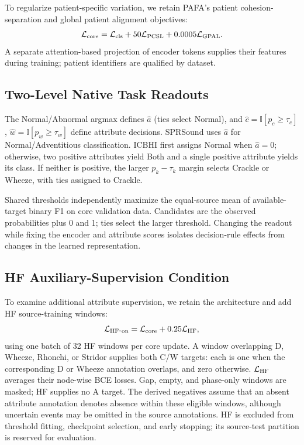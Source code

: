 To regularize patient-specific variation, we retain PAFA's patient
cohesion-separation and global patient alignment objectives\cite{jeong2025pafa}:
\begin{equation}
\mathcal L_{\rm core}=\mathcal L_{\rm cls}+50\mathcal L_{\rm PCSL}
                                  +0.0005\mathcal L_{\rm GPAL}.
\end{equation}
A separate attention-based projection of encoder tokens supplies their
features during training; patient identifiers are qualified by dataset.

\subsection{Two-Level Native Task Readouts}
The Normal/Abnormal argmax defines $\hat a$ (ties select Normal), and
$\hat c=\mathbb{I}[p_c\geq\tau_c]$,
$\hat w=\mathbb{I}[p_w\geq\tau_w]$ define attribute decisions.
SPRSound uses $\hat a$ for Normal/Adventitious classification.
ICBHI first assigns Normal when $\hat a=0$; otherwise, two positive
attributes yield Both and a single positive attribute yields its class.
If neither is positive, the larger $p_k-\tau_k$ margin selects Crackle
or Wheeze, with ties assigned to Crackle.

Shared thresholds independently maximize the equal-source mean of
available-target binary F1 on core validation data. Candidates are the
observed probabilities plus 0 and 1; ties select the larger threshold.
Changing the readout while fixing the encoder and attribute scores isolates
decision-rule effects from changes in the learned representation.

\subsection{HF Auxiliary-Supervision Condition}
\label{sec:hf_method}
To examine additional attribute supervision, we retain the architecture
and add HF source-training windows:
\begin{equation}
\mathcal L_{\rm HF\mbox{-}on}=\mathcal L_{\rm core}+0.25\mathcal L_{\rm HF},
\end{equation}
using one batch of 32 HF windows per core update. A window overlapping
D, Wheeze, Rhonchi, or Stridor supplies both C/W targets: each is one
when the corresponding D or Wheeze annotation overlaps, and zero otherwise.
$\mathcal L_{\rm HF}$ averages their node-wise BCE losses.
Gap, empty, and phase-only windows are masked; HF supplies no A target.
The derived negatives assume that an absent attribute annotation denotes
absence within these eligible windows, although uncertain events may be
omitted in the source annotations\cite{hsu2021hflung}.
HF is excluded from threshold fitting, checkpoint selection, and early
stopping; its source-test partition is reserved for evaluation.

